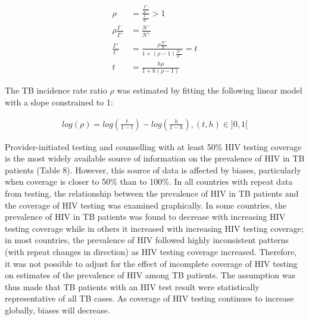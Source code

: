 \begin{equation*}
\begin{align*}
\rho &= \frac{\frac{I^+}{N^+}}{\frac{I^-}{N^-}} > 1    \\
\rho \frac{I^-}{I^+} &= \frac{N^-}{N^+}  \\
\frac{I^+}{I^-} &= \frac{\rho \frac{N^+}{N^-}}{1 + (\rho - 1)\frac{N^+}{N^-}} = t \\
t &= \frac{h \rho}{1 + h(\rho - 1)}
\end{align*}
\end{equation*}

The TB incidence rate ratio $\rho$ was estimated by fitting the following linear model with a slope constrained to 1:

\begin{align}
log(\rho) = log \left(\frac{t}{1-t}\right) - log \left(\frac{h}{1-h}\right), (t, h) \in ]0,1[
\label{eqn:irr}
\end{align}

Provider-initiated testing and counselling with at least 50\% HIV testing coverage is the most widely available source of information on the prevalence of HIV in TB patients (Table 8). However, this source of data is affected by biases, particularly when coverage is closer to 50\% than to 100\%. In all countries with repeat data from testing, the relationship between the prevalence of HIV in TB patients and the coverage of HIV testing was examined graphically. In some countries, the prevalence of HIV in TB patients was found to decrease with increasing HIV testing coverage while in others it increased with increasing HIV testing coverage; in most countries, the prevalence of HIV followed highly inconsistent patterns (with repeat changes in direction) as HIV testing coverage increased. Therefore, it was not possible to adjust for the effect of incomplete coverage of HIV testing on estimates of the prevalence of HIV among TB patients. The assumption was thus made that TB patients with an HIV test result were statistically representative of all TB cases. As coverage of HIV testing continues to increase globally, biases will decrease. 


